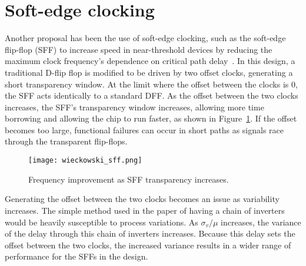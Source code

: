 \section{Soft-edge clocking}
\label{sec:softedge}

Another proposal has been the use of soft-edge clocking, such as the soft-edge flip-flop (SFF) to increase speed in near-threshold devices by reducing the maximum clock frequency's dependence on critical path delay~\cite{Wieckowski:2008bo}.
 In this design, a traditional D-flip flop is modified to be driven by two offset clocks, generating a short transparency window.
 At the limit where the offset between the clocks is 0, the SFF acts identically to a standard DFF.
 As the offset between the two clocks increases, the SFF's transparency window increases, allowing more time borrowing and allowing the chip to run faster, as shown in Figure~\ref{fig:sff}.
 If the offset becomes too large, functional failures can occur in short paths as signals race through the transparent flip-flops. 
\begin{figure}[thpb]
    \centering
    \texttt{[image: wieckowski\_sff.png]}
    \caption{Frequency improvement as SFF transparency increases.~\cite{Wieckowski:2008bo}}
    \label{fig:sff}
\end{figure}

Generating the offset between the two clocks becomes an issue as variability increases.
 The simple method used in the paper of having a chain of inverters would be heavily susceptible to process variations.
As $\sigma_v/\mu$ increases, the variance of the delay through this chain of inverters increases.
Because this delay sets the offset between the two clocks, the increased variance results in a wider range of performance for the SFFs in the design.

